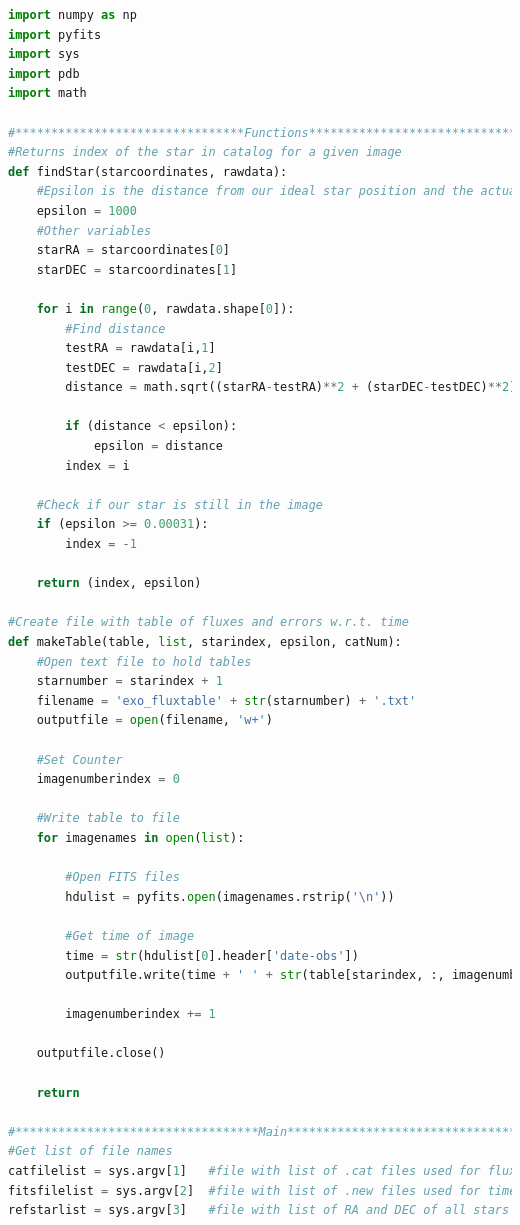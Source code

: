 \documentclass{aastex61}
\begin{document}
\begin{lstlisting}[language = Python, caption = Outputs the flux and its error for each star in every exposure as well as the time for each image (YM)]
import numpy as np
import pyfits
import sys
import pdb
import math

#********************************Functions**************************************
#Returns index of the star in catalog for a given image
def findStar(starcoordinates, rawdata):
	#Epsilon is the distance from our ideal star position and the actual position
	epsilon = 1000
	#Other variables
	starRA = starcoordinates[0]
	starDEC = starcoordinates[1]
	
	for i in range(0, rawdata.shape[0]):
		#Find distance
		testRA = rawdata[i,1]
		testDEC = rawdata[i,2]
		distance = math.sqrt((starRA-testRA)**2 + (starDEC-testDEC)**2)
		
		if (distance < epsilon):
			epsilon = distance
		index = i
	
	#Check if our star is still in the image
	if (epsilon >= 0.00031):
		index = -1
	
	return (index, epsilon)

#Create file with table of fluxes and errors w.r.t. time
def makeTable(table, list, starindex, epsilon, catNum):
	#Open text file to hold tables
	starnumber = starindex + 1
	filename = 'exo_fluxtable' + str(starnumber) + '.txt'
	outputfile = open(filename, 'w+') 
	
	#Set Counter
	imagenumberindex = 0     
	
	#Write table to file
	for imagenames in open(list):
		
		#Open FITS files
		hdulist = pyfits.open(imagenames.rstrip('\n'))
		
		#Get time of image
		time = str(hdulist[0].header['date-obs'])
		outputfile.write(time + ' ' + str(table[starindex, :, imagenumberindex]) + ' ' + str(epsilon[starindex, imagenumberindex]) + ' ' + str(catNum[starindex, imagenumberindex]) + '\n')	
		
		imagenumberindex += 1
	
	outputfile.close()
	
	return

#**********************************Main*****************************************
#Get list of file names
catfilelist = sys.argv[1]   #file with list of .cat files used for fluxes
fitsfilelist = sys.argv[2]  #file with list of .new files used for times
refstarlist = sys.argv[3]   #file with list of RA and DEC of all stars


\end{lstlisting}
\end{document}
